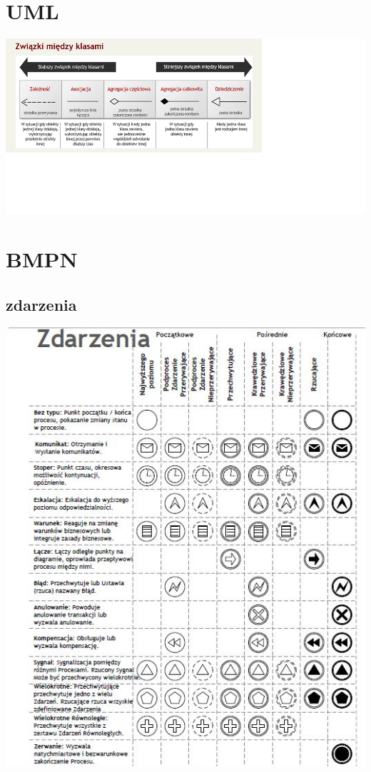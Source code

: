\documentclass[11pt]{article}
\author{Patryk Kaniewski}
\date{\today}
\title{}
\begin{document}
\tableofcontents \clearpage\section{UML}
\label{sec:orgd62a377}
\begin{center}
\includegraphics[width=.9\linewidth]{./zwiazki_UML.png}
\end{center}

\section{BMPN}
\label{sec:orgce25d9a}
\subsection{zdarzenia}
\label{sec:orgeedc754}
\begin{center}
\includegraphics[width=.9\linewidth]{./zdarzenia.png}
\end{center}
\end{document}

